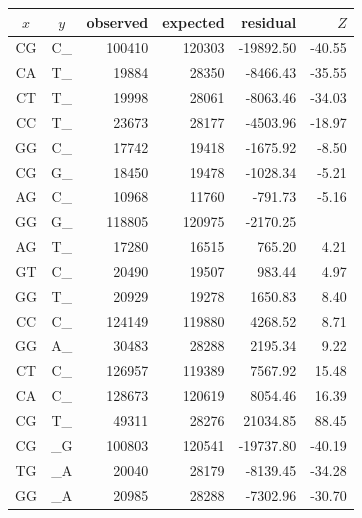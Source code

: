 \documentclass{article}
\newcommand{\nA}{\mbox{A}}  %
\newcommand{\nC}{\mbox{C}}
\newcommand{\nG}{\mbox{G}}
\newcommand{\nT}{\mbox{T}}
\theoremstyle{plain}
\theoremstyle{definition}
\begin{document}
    \begin{center}
        \begin{tabular}{ccrrrr}
                $x$ & $y$ & observed &   expected &    residual &  $Z$ \\
                \hline
                \nC\nG  & \nC\_   & 100410   &  120303    & -19892.50   &	-40.55  \\
                \nC\nA  & \nT\_   &  19884   &   28350    &  -8466.43   &	-35.55  \\
                \nC\nT  & \nT\_   &  19998   &   28061    &  -8063.46   &	-34.03  \\
                \nC\nC  & \nT\_   &  23673   &   28177    &  -4503.96   &	-18.97  \\
                \nG\nG  & \nC\_   &  17742   &   19418    &  -1675.92   &	 -8.50  \\
                \nC\nG  & \nG\_   &  18450   &   19478    &  -1028.34   &	 -5.21  \\
                \nA\nG  & \nC\_   &  10968   &   11760    &   -791.73   &	 -5.16  \\
                \nG\nG  & \nG\_   & 118805   &  120975    &  -2170.25   &    \\
                \hline
                \nA\nG  & \nT\_   &  17280   &   16515    &    765.20   &  4.21   \\
                \nG\nT  & \nC\_   &  20490   &   19507    &    983.44   &  4.97   \\
                \nG\nG  & \nT\_   &  20929   &   19278    &   1650.83   &  8.40   \\
                \nC\nC  & \nC\_   & 124149   &  119880    &   4268.52   &  8.71   \\
                \nG\nG  & \nA\_   &  30483   &   28288    &   2195.34   &  9.22   \\
                \nC\nT  & \nC\_   & 126957   &  119389    &   7567.92   & 15.48   \\
                \nC\nA  & \nC\_   & 128673   &  120619    &   8054.46   & 16.39   \\
                \nC\nG  & \nT\_   &  49311   &   28276    &  21034.85   & 88.45   \\
                \hline
                \hline
                \nC\nG  &  \_\nG  &  100803  &  120541  &  -19737.80  &  -40.19 \\
                \nT\nG  &  \_\nA  &   20040  &   28179  &   -8139.45  &  -34.28 \\
                \nG\nG  &  \_\nA  &   20985  &   28288  &   -7302.96  &  -30.70 \\

\end{tabular}
\end{center}
\end{document}
